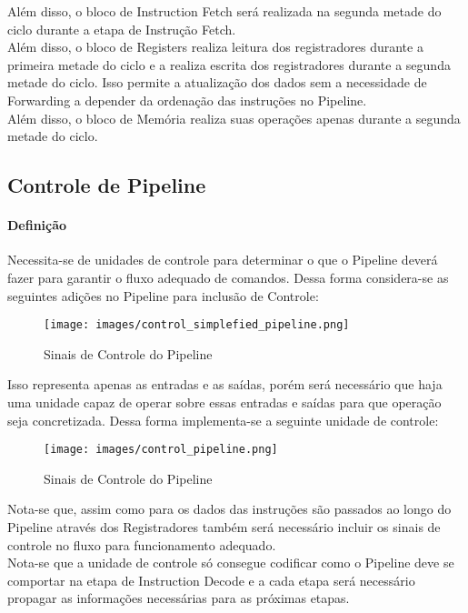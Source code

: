 \documentclass{article}
\begin{document}
\noindent Além disso, o bloco de Instruction Fetch será realizada na segunda metade do ciclo durante a etapa de Instrução Fetch.\\

\noindent Além disso, o bloco de Registers realiza leitura dos registradores durante a primeira metade do ciclo e a realiza escrita dos registradores durante a segunda metade do ciclo. Isso permite a atualização dos dados sem a necessidade de Forwarding a depender da ordenação das instruções no Pipeline.\\

\noindent Além disso, o bloco de Memória realiza suas operações apenas durante a segunda metade do ciclo.



\subsection{Controle de Pipeline}
\paragraph{Definição}Necessita-se de unidades de controle para determinar o que o Pipeline deverá fazer para garantir o fluxo adequado de comandos. Dessa forma considera-se as seguintes adições no Pipeline para inclusão de Controle:
\begin{figure}[H]
    \centering
    \texttt{[image: images/control\_simplefied\_pipeline.png]}
    \caption{Sinais de Controle do Pipeline}
    \label{controlSimplifyPipeline}
\end{figure}
\noindent Isso representa apenas as entradas e as saídas, porém será necessário que haja uma unidade capaz de operar sobre essas entradas e saídas para que operação seja concretizada. Dessa forma implementa-se a seguinte unidade de controle:

\begin{figure}[H]
    \centering
    \texttt{[image: images/control\_pipeline.png]}
    \caption{Sinais de Controle do Pipeline}
    \label{controlPipeline}
\end{figure}
\noindent Nota-se que, assim como para os dados das instruções são passados ao longo do Pipeline através dos Registradores também será necessário incluir os sinais de controle no fluxo para funcionamento adequado.\\

\noindent Nota-se que a unidade de controle só consegue codificar como o Pipeline deve se comportar na etapa de Instruction Decode e a cada etapa será necessário propagar as informações necessárias para as próximas etapas.
\end{document}
